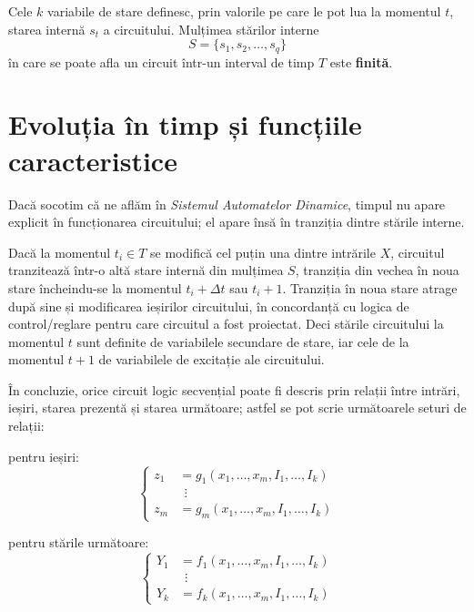Cele $k$ variabile de stare definesc, prin valorile pe care le pot lua la
momentul $t$, starea internă $s_t$ a circuitului. Mulțimea stărilor interne
\[
  S = \{s_1, s_2, \dots, s_q\}
\]
în care se poate afla un circuit într-un interval de timp $T$ este
\textbf{finită}.

\section{Evoluția în timp și funcțiile caracteristice}

Dacă socotim că ne aflăm în \emph{Sistemul Automatelor Dinamice}, timpul nu
apare explicit în funcționarea circuitului; el apare însă în tranziția dintre
stările interne.

Dacă la momentul $t_i \in T$ se modifică cel puțin una dintre intrările $X$,
circuitul tranzitează într-o altă stare internă din mulțimea $S$, tranziția din
vechea în noua stare încheindu-se la momentul $t_i + \Delta t$ sau $t_i + 1$.
Tranziția în noua stare atrage după sine și modificarea ieșirilor circuitului, în
concordanță cu logica de control/reglare pentru care circuitul a fost proiectat.
Deci stările circuitului la momentul $t$ sunt definite de variabilele secundare
de stare, iar cele de la momentul $t+1$ de variabilele de excitație ale
circuitului.

În concluzie, orice circuit logic secvențial poate fi descris prin relații între
intrări, ieșiri, starea prezentă și starea următoare; astfel se pot scrie
următoarele seturi de relații:

\noindent pentru ieșiri:
\begin{equation}\label{eq:iesiri}
\left\{
\begin{aligned}
  z_1 &= g_1(x_1, \dots, x_m, I_1, \dots, I_k)\\
      &\ \ \vdots\\
  z_m &= g_m(x_1, \dots, x_m, I_1, \dots, I_k)
\end{aligned}
\right.
\end{equation}

\noindent pentru stările următoare:
\begin{equation}\label{eq:stari}
\left\{
\begin{aligned}
  Y_1 &= f_1(x_1, \dots, x_m, I_1, \dots, I_k)\\
      &\ \ \vdots\\
  Y_k &= f_k(x_1, \dots, x_m, I_1, \dots, I_k)
\end{aligned}
\right.
\end{equation}

